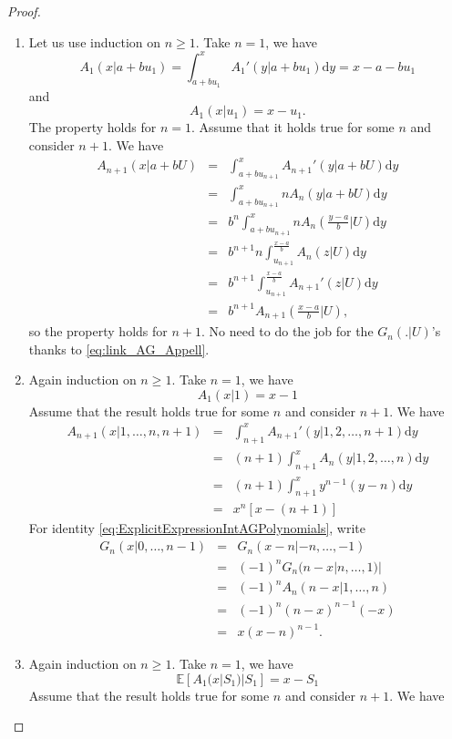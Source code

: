 \begin{proof}
\begin{enumerate}
  \item Let us use induction on $n\geq1$. Take $n = 1$, we have
  $$
  A_1(x|a + bu_1) = \int_{a+bu_1}^{x} A_1'(y|a+bu_1)\text{d}y = x - a - bu_1 
  $$
  and 
   $$
  A_1(x|u_1) = x-u_1.
  $$
  The property holds for $n = 1$. Assume that it holds true for some $n$ and consider $n+1$. We have
  \begin{eqnarray*}
  A_{n+1}(x|a+bU) &=& \int^{x}_{a+b u_{n+1}}A_{n+1}'(y|a+bU)\text{d}y\\
  &=& \int^{x}_{a+b u_{n+1}}nA_{n}(y|a+bU)\text{d}y\\
  &=&b^n\int^{x}_{a+b u_{n+1}}nA_{n}\left(\frac{y-a}{b}\Big|U\right)\text{d}y\\
  &=&b^{n+1}n\int^{\frac{x-a}{b}}_{u_{n+1}}A_{n}\left(z\Big|U\right)\text{d}y\\
  &=&b^{n+1}\int^{\frac{x-a}{b}}_{u_{n+1}}A_{n+1}'\left(z\Big|U\right)\text{d}y\\
  &=&b^{n+1}A_{n+1}\left(\frac{x-a}{b}\Big|U\right),
  \end{eqnarray*}
  so the property holds for $n+1$. No need to do the job for the $G_n(.|U)$'s thanks to \eqref{eq:link_AG_Appell}.
\item Again induction on $n\geq1$. Take $n = 1$, we have
$$
A_1(x|1) = x-1
$$
Assume that the result holds true for some $n$ and consider $n+1$. We have 
\begin{eqnarray*}
A_{n+1}(x|1,\ldots, n,n+1) &=& \int_{n+1}^{x}A_{n+1}'(y|1,2,\ldots, n+1)\text{d}y\\
&=& (n+1)\int_{n+1}^{x}A_{n}(y|1,2,\ldots, n)\text{d}y\\
&=& (n+1)\int_{n+1}^{x}y^{n-1}(y-n)\text{d}y\\
&=& x^n[x - (n + 1)]
\end{eqnarray*}
For identity \eqref{eq:ExplicitExpressionIntAGPolynomials}, write 
\begin{eqnarray*}
G_{n}(x|0,\ldots, n-1)&=&G_{n}(x-n|-n ,\ldots,-1)\\
&=&(-1)^nG_{n}(n-x|n,\ldots, 1)|\\
&=&(-1)^nA_{n}(n-x|1,\ldots, n)\\
&=&(-1)^n(n-x)^{n-1}(-x)\\
&=&x(x-n)^{n-1}.
\end{eqnarray*}
\item Again induction on $n\geq1$. Take $n = 1$, we have
$$
\mathbb{E}[A_1(x|S_1)|S_1] = x-S_1
$$
Assume that the result holds true for some $n$ and consider $n+1$. We have 

\end{enumerate}
\end{proof}
